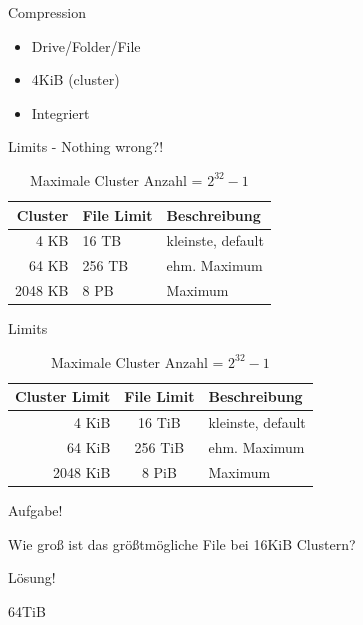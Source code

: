 \documentclass[12pt]{beamer}
\begin{document}
\begin{frame}{Compression}
\begin{itemize}
\item Drive/Folder/File
\item 4KiB (cluster)
\item Integriert
\end{itemize}
\end{frame}

\begin{frame}{Limits - Nothing wrong?!}
\begin{center}
\Large
\begin{table}
\begin{tabular}{r|l|l}
\Large Cluster & \Large File Limit & \Large Beschreibung\\
\hline
4 KB & 16 TB & kleinste, default\\
64 KB & 256 TB & ehm. Maximum\\
2048 KB & 8 PB & Maximum
\end{tabular}
\caption{Maximale Cluster Anzahl = $2^{32}-1$}
\end{table}
\end{center}
\end{frame}


\begin{frame}{Limits}
\begin{center}
\Large
\begin{table}
\begin{tabular}{r|c|l}
\Large Cluster Limit & \Large File Limit & \Large Beschreibung\\
\hline
4 KiB & 16 TiB & kleinste, default\\
64 KiB & 256 TiB & ehm. Maximum\\
2048 KiB & 8 PiB & Maximum
\end{tabular}
\caption{Maximale Cluster Anzahl = $2^{32}-1$}
\end{table}
\end{center}
\end{frame}

\begin{frame}{Aufgabe!}
\begin{center}
\huge Wie groß ist das größtmögliche File bei 16KiB Clustern?
\end{center}
\end{frame}

\begin{frame}{Lösung!}
\begin{center}
\huge 64TiB
\end{center}
\end{frame}
\end{document}
